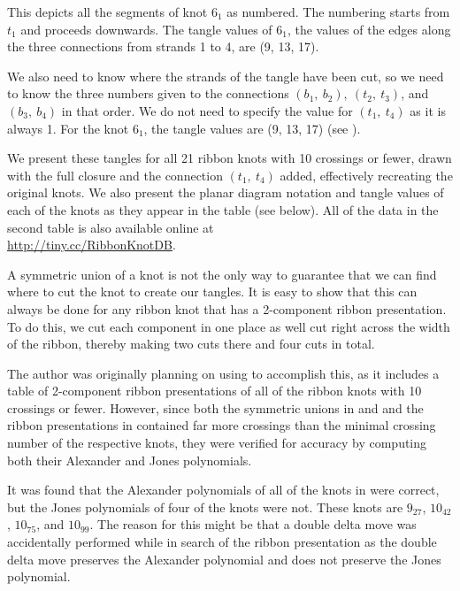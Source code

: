 \begin{paper}
{This depicts all the segments of knot $6_1$ as numbered.
The numbering starts from $t_1$ and proceeds downwards.
The tangle values of $6_1$, the values of the edges along the three connections
from strands 1 to 4, are (9, 13, 17).}

We also need to know where the strands of the tangle have been cut, so we need
to know the three numbers given to the connections $(b_1,~b_2),~(t_2,~t_3)$, and
$(b_3,~b_4)$ in that order.
We do not need to specify the value for $(t_1,~t_4)$ as it is always 1.
For the knot $6_1$, the tangle values are (9, 13, 17) (see \figExample).

We present these tangles for all 21 ribbon knots with 10 crossings or fewer,
drawn with the full closure and the connection $(t_1,~t_4)$ added, effectively
recreating the original knots.
We also present the planar diagram notation and tangle values of each of the
knots as they appear in the table (see below).
All of the data in the second table is also available online at\\
\url{http://tiny.cc/RibbonKnotDB}.


A symmetric union of a knot is not the only way to guarantee that we can find
where to cut the knot to create our tangles.
It is easy to show that this can always be done for any ribbon knot that has a
2-component ribbon presentation.
To do this, we cut each component in one place as well cut right across the
width of the ribbon, thereby making two cuts there and four cuts in total.

The author was originally planning on using \cite{knots} to accomplish this, as
it includes a table of 2-component ribbon presentations of all of the ribbon
knots with 10 crossings or fewer.
However, since both the symmetric unions in \cite{one} and \cite{many} and the
ribbon presentations in \cite{knots} contained far more crossings than the
minimal crossing number of the respective knots, they were verified for accuracy
by computing both their Alexander and Jones polynomials.

It was found that the Alexander polynomials of all of the knots in \cite{knots}
were correct, but the Jones polynomials of four of the knots were not.
These knots are $9_{27}$, $10_{42}$, $10_{75}$, and $10_{99}$.
The reason for this might be that a double delta move was accidentally performed
while in search of the ribbon presentation as the double delta move preserves
the Alexander polynomial and does not preserve the Jones polynomial.


\end{paper}
